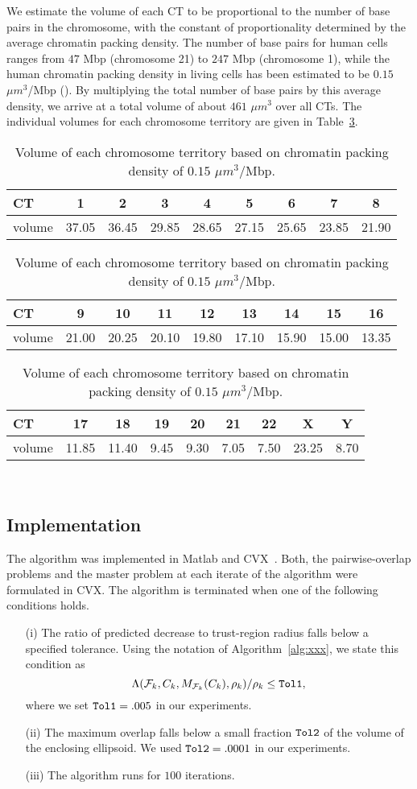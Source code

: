 \documentclass{siamltex}
\begin{document}
We estimate the volume of each CT to be proportional to the number of
base pairs in the chromosome, with the constant of proportionality
determined by the average chromatin packing density.  The number of base
pairs for human cells ranges from $47$ Mbp (chromosome 21) to $247$
Mbp (chromosome 1), while the human chromatin packing density in living
cells has been estimated to be $0.15$ $\mu m^3$/Mbp
(\cite{Mueller_chr_packing}). By multiplying the total number of base
pairs by this average density, we arrive at a total volume of about
$461$ $\mu m^3$ over all CTs. The individual volumes for each
chromosome territory are given in
Table~\ref{table_chr_volume}.

\begin{table}[!h]
 \centering
\caption{Volume of each chromosome territory based on chromatin packing density of $0.15$ $\mu m^3$/Mbp.}
\label{table_chr_volume}
\begin{tabular}{l | c c c c c c c c}
CT & 1 & 2 & 3 & 4 & 5 & 6 & 7 & 8 \\ \hline
volume & 37.05 & 36.45 & 29.85 & 28.65 & 27.15 & 25.65 & 23.85 & 21.90 \end{tabular}

\begin{tabular}{l | c c c c c c c c}
CT & 9 & 10 & 11 & 12 & 13 & 14 & 15 & 16 \\ \hline
volume &  21.00 & 20.25 & 20.10 & 19.80 & 17.10 & 15.90 & 15.00 & 13.35
\end{tabular}

\begin{tabular}{l | c c c c c c c c}
CT & 17 & 18 & 19 & 20 & 21 & 22 & X & Y\\ \hline
volume & 11.85 & 11.40 & 9.45 & 9.30 & 7.05 & 7.50 & 23.25 & 8.70
\end{tabular}\;\,\quad\quad\quad
\end{table}

\subsection{Implementation} \label{sec:implementation}

The algorithm was implemented in Matlab and CVX~\cite{GraB12}. Both,
the pairwise-overlap problems and the master problem at each iterate
of the algorithm were formulated in CVX. The algorithm is terminated
when one of the following conditions holds.
\begin{itemize}
\item[(i)] The ratio of predicted decrease to trust-region radius
  falls below a specified tolerance. Using the notation of
  Algorithm~\ref{alg:xxx}, we state this condition as
\[
\Lambda({{\cal F}}_k,C_k,M_{{{\cal F}}_k}(C_k),\rho_k) / \rho_k \le \mbox{\tt Tol1},
\]
where we set $\mbox{\tt Tol1} = .005$ in our experiments.
\item[(ii)] The maximum overlap falls below a small fraction
  $\mbox{\tt Tol2}$ of the volume of the enclosing ellipsoid. We used
  $\mbox{\tt Tol2}=.0001$ in our experiments.
\item[(iii)] The algorithm runs for $100$ iterations.
\end{itemize}
\end{document}
